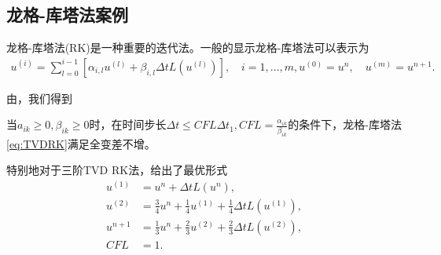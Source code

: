 \subsection{龙格-库塔法案例}
龙格-库塔法(RK)是一种重要的迭代法。一般的显示龙格-库塔法可以表示为
\begin{equation}
	\begin{aligned}
		u^{(i)} = \sum_{l=0}^{i-1}[\alpha_{i,l}u^{(l)} + \beta_{i,l}\Delta tL(u^{(l)})], \quad i = 1,...,m,
		u^{(0)}=u^n,\quad u^{(m)} = u^{n+1}.
	\end{aligned}
	\label{eq:TVDRK}
\end{equation}

由\parencite{shu1998total}，我们得到
\begin{lemma}
	当$a_{ik} \geq 0, \beta_{ik} \geq 0$时，在时间步长$\Delta t \leq CFL \Delta t_1, CFL = \frac{\alpha_{ik}}{\beta_{ik}}$的条件下，龙格-库塔法\eqref{eq:TVDRK}满足全变差不增。
\end{lemma}

特别地对于三阶TVD RK法，\parencite{shu1998total}给出了最优形式
\begin{equation}
	\begin{aligned}
		u^{(1)} & = u^n + \Delta t L(u^n),                                                \\
		u^{(2)} & = \frac{3}{4}u^n + \frac{1}{4}u^{(1)} + \frac{1}{4}\Delta t L(u^{(1)}), \\
		u^{n+1} & = \frac{1}{3}u^n + \frac{2}{3}u^{(2)} + \frac{2}{3}\Delta t L(u^{(2)}), \\
		CFL     & = 1.
	\end{aligned}
\end{equation}

